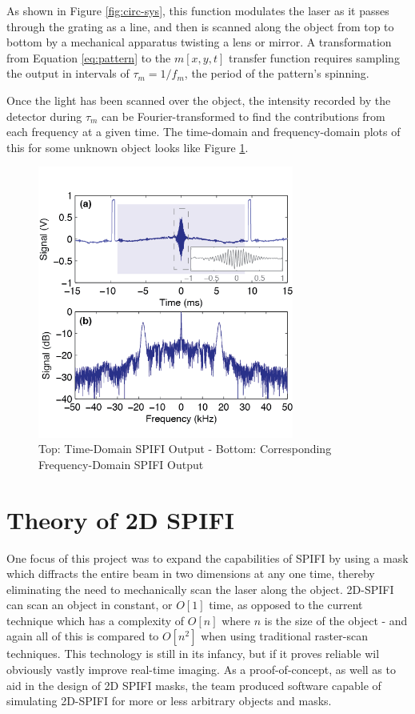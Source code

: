 \documentclass[12pt]{article}
\begin{document}
As shown in Figure \ref{fig:circ-sys}, this function modulates the laser as it passes
through the grating as a line, and then is scanned along the object from top
to bottom by a mechanical apparatus twisting a lens or mirror. A transformation from Equation
\ref{eq:pattern} to the $m[x,y,t]$ transfer function requires sampling the
output in intervals of $\tau_m=1/f_m$, the period of the pattern's 
spinning. 

Once the light has been scanned over the object, the intensity recorded by
the detector during $\tau_m$ can be Fourier-transformed to find the
contributions from each frequency at a given time. The time-domain and frequency-domain plots of this for some
unknown object looks like Figure \ref{fig:fourier}. 

\begin{figure}[H]
\centering
\includegraphics[width=0.75\textwidth]{Fourier_Transform}
\caption{Top: Time-Domain SPIFI Output - Bottom: Corresponding Frequency-Domain SPIFI Output\label{fig:fourier}}
\end{figure}

\section*{Theory of 2D SPIFI}
One focus of this project was to expand the capabilities of SPIFI by using a
mask which diffracts the entire beam in two dimensions at any one time,
thereby eliminating the need to mechanically scan the laser along the object. 2D-SPIFI can scan an object in constant, or $O[1]$ time, as opposed to the current technique which has a complexity of $O[n]$ where $n$ is the size of the object - and again all of this is compared to $O[n^2]$ when using traditional raster-scan techniques. This technology is still in its infancy, but if it proves reliable wil obviously vastly improve real-time imaging. As a proof-of-concept, as well as to aid in the design of 2D SPIFI masks, the team produced software capable of simulating 2D-SPIFI for more or less arbitrary objects and masks.
\end{document}
